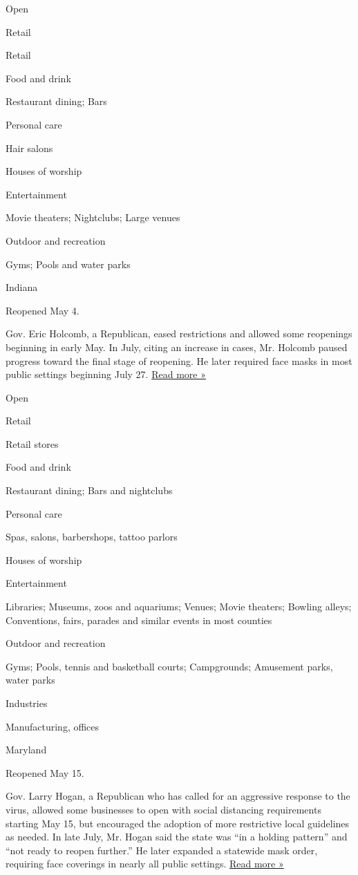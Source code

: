 Open

Retail

Retail

Food and drink

Restaurant dining; Bars

Personal care

Hair salons

Houses of worship

Entertainment

Movie theaters; Nightclubs; Large venues

Outdoor and recreation

Gyms; Pools and water parks

Indiana

Reopened May 4.

Gov. Eric Holcomb, a Republican, eased restrictions and allowed some
reopenings beginning in early May. In July, citing an increase in cases,
Mr. Holcomb paused progress toward the final stage of reopening. He
later required face masks in most public settings beginning July 27.
\href{https://www.indystar.com/story/news/health/2020/07/29/indiana-coronavirus-stage-4-5-continue-through-least-aug-27/5538222002/}{Read
more »}

Open

Retail

Retail stores

Food and drink

Restaurant dining; Bars and nightclubs

Personal care

Spas, salons, barbershops, tattoo parlors

Houses of worship

Entertainment

Libraries; Museums, zoos and aquariums; Venues; Movie theaters; Bowling
alleys; Conventions, fairs, parades and similar events in most counties

Outdoor and recreation

Gyms; Pools, tennis and basketball courts; Campgrounds; Amusement parks,
water parks

Industries

Manufacturing, offices

Maryland

Reopened May 15.

Gov. Larry Hogan, a Republican who has called for an aggressive response
to the virus, allowed some businesses to open with social distancing
requirements starting May 15, but encouraged the adoption of more
restrictive local guidelines as needed. In late July, Mr. Hogan said the
state was ``in a holding pattern'' and ``not ready to reopen further.''
He later expanded a statewide mask order, requiring face coverings in
nearly all public settings.
\href{https://www.wbaltv.com/article/coronavirus-maryland-governor-larry-hogan-response-recovery-efforts/33450849}{Read
more »}

